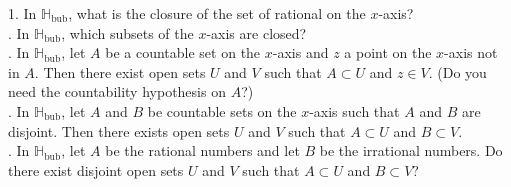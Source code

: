 \documentclass[a4paper,12pt,twoside]{hmcpset}
\begin{document}
\begin{exercise}[Exercise 4.10]
    1. In $\mathbb{H}_\text{bub}$, what is the closure of the set of
rational on the $x$-axis?\\
\vspace{2mm}
. In $\mathbb{H}_\text{bub}$, which subsets of the $x$-axis are
closed?\\
\vspace{2mm}
. In $\mathbb{H}_\text{bub}$, let $A$ be a countable set on the
$x$-axis and $z$ a point on the $x$-axis not in $A$. Then there exist
open sets $U$ and $V$ such that $A \subset U$ and $z \in V$. (Do you
need the countability hypothesis on $A$?)\\
\vspace{2mm}
. In $\mathbb{H}_\text{bub}$, let $A$ and $B$ be countable sets on
the $x$-axis such that $A$ and $B$ are disjoint. Then there exists
open sets $U$ and $V$ such that $A \subset U$ and $B \subset V$.\\
\vspace{2mm}
. In $\mathbb{H}_\text{bub}$, let $A$ be the rational numbers and let
$B$ be the irrational numbers. Do there exist disjoint open sets $U$
and $V$ such that $A \subset U$ and $B \subset V$?
\end{exercise}
\end{document}
